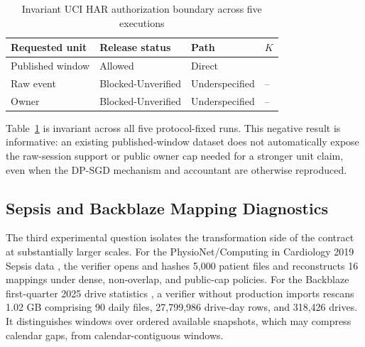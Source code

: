 \begin{table}[H]
    \centering
    \caption{Invariant UCI HAR authorization boundary across five executions}
    \label{tab:ch2-uci-authorization}
    \small
    \setlength{\tabcolsep}{5pt}
    \renewcommand{\arraystretch}{1.15}
    \begin{tabular}{@{}
        >{\raggedright\arraybackslash}p{}
        >{\centering\arraybackslash}p{}
        >{\centering\arraybackslash}p{}
        >{\centering\arraybackslash}p{}@{}}
        \toprule
        \textbf{Requested unit} & \textbf{Release status} &
        \textbf{Path} & \textbf{\(K\)} \\
        \midrule
        Published window & \textsf{Allowed} & \textsf{Direct} & 1 \\
        Raw event & \textsf{Blocked-Unverified} & \textsf{Underspecified} & -- \\
        Owner & \textsf{Blocked-Unverified} & \textsf{Underspecified} & -- \\
        \bottomrule
    \end{tabular}
\end{table}

Table~\ref{tab:ch2-uci-authorization} is invariant across all five protocol-fixed
runs.  This negative result is informative: an existing published-window dataset
does not automatically expose the raw-session support or public owner cap needed
for a stronger unit claim, even when the DP-SGD mechanism and accountant are
otherwise reproduced.

\subsection{Sepsis and Backblaze Mapping Diagnostics}
\label{subsec:ch2-mapping-diagnostics}

The third experimental question isolates the transformation side of the contract
at substantially larger scales.  For
the PhysioNet/Computing in Cardiology 2019 Sepsis data
\cite{goldberger2000physiobank,reyna2019sepsis,reyna2020sepsis}, the verifier
opens and hashes 5,000 patient files and reconstructs 16 mappings under dense,
non-overlap, and public-cap policies.  For the Backblaze first-quarter 2025 drive
statistics \cite{backblaze2025stats}, a verifier without production imports
rescans 1.02 GB comprising 90 daily files, 27,799,986 drive-day rows, and 318,426
drives.  It distinguishes windows over ordered available snapshots, which may
compress calendar gaps, from calendar-contiguous windows.

